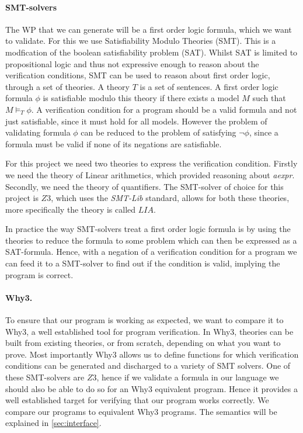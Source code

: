 \paragraph{SMT-solvers}
The WP that we can generate will be a first order logic formula, which we want to validate. For this we use Satisfiability Modulo Theories (SMT).
This is a modfication of the boolean satisfiability problem (SAT).
Whilst SAT is limited to propositional logic and thus not expressive enough to reason about the verification conditions, SMT can be used to reason about first order logic, through a set of theories.
A theory $T$ is a set of sentences.
A first order logic formula $\phi$ is satisfiable modulo this theory if there exists a model $M$ such that $M \vDash_{T}\phi$. A verification condition for a program should be a valid formula and not just satisfiable, since it must hold for all models. However the problem of validating formula $\phi$ can be reduced to the problem of satisfying $\neg \phi$, since a formula must be valid if none of its negations are satisfiable.

For this project we need two theories to express the verification condition. 
Firstly we need the theory of Linear arithmetics, which provided reasoning about \textit{aexpr}. 
Secondly, we need the theory of quantifiers. The SMT-solver of choice for this project is $Z3$\cite{z3}, which uses the \textit{SMT-Lib} standard, allows for both these theories, more specifically the theory is called $LIA$\cite{smtlib}.

In practice the way SMT-solvers treat a first order logic formula is by using the theories to reduce the formula to some problem which can then be expressed as a SAT-formula. 
Hence, with a negation of a verification condition for a program we can feed it to a SMT-solver to find out if the condition is valid, implying the program is correct.

\paragraph{Why3.}
To ensure that our program is working as expected, we want to compare it to Why3, a well established tool for program verification.
In Why3, theories can be built from existing theories, or from scratch, depending on what you want to prove.
Most importantly Why3 allows us to define functions for which verification conditions can be generated and discharged to a variety of SMT solvers\cite{why3}.
One of these SMT-solvers are $Z3$, hence if we validate a formula in our language we should also be able to do so for an Why3 equivalent program.
Hence it provides a well established target for verifying that our program works correctly. We compare our programs to equivalent Why3 programs. The semantics will be explained in \cref{sec:interface}.
